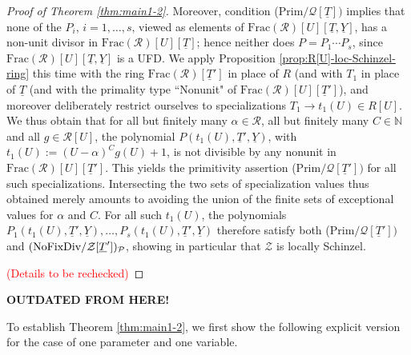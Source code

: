 \documentclass[11pt,a4paper,reqno]{amsart}
\theoremstyle{definition}
\begin{document}
\begin{proof}[Proof of Theorem \ref{thm:main1-2}]
 Moreover, condition {\rm (Prim}$/{\mathcal Q}[\underline T])$ implies that none of the $P_i$, $i=1,\dots, s$, viewed as elements of $\textrm{Frac}(\mathcal{R})[U][\underline{T}, \underline{Y}]$, has a non-unit divisor in $\textrm{Frac}(\mathcal{R})[U][\underline{T}]$; hence neither does $P=P_1\cdots P_s$, since $\textrm{Frac}(\mathcal{R})[U][\underline{T}, \underline{Y}]$ is a UFD. 
We apply Proposition \ref{prop:R[U]-loc-Schinzel-ring} this time with the ring $\textrm{Frac}(\mathcal{R})[\underline{T}']$ in place of $R$ (and with $T_1$ in place of $\underline{T}$ (and with the primality type ``Nonunit" of $\textrm{Frac}(\mathcal{R})[U][\underline{T}']$), and moreover deliberately restrict ourselves to specializations $T_1\to t_1(U)\in R[U]$. We thus obtain
that for all but finitely many $\alpha\in \mathcal{R}$, all but finitely many $C\in \mathbb{N}$ and all $g\in \mathcal{R}[U]$, the polynomial $P(t_1(U),\underline{T}', \underline{Y})$, with $t_1(U):=(U-\alpha)^C g(U)+1$, is not divisible by any nonunit in $\textrm{Frac}(\mathcal{R})[U][\underline{T}']$. This yields the primitivity assertion {\rm(Prim}$/{\mathcal Q}[\underline T'])$ for all such specializations. Intersecting the two sets of specialization values thus obtained merely amounts to avoiding the union of the finite sets of exceptional values for $\alpha$ and $C$. For all such $t_1(U)$, the polynomials $P_1(t_1(U),\underline T', \underline Y), \dots, P_s(t_1(U),\underline T',\underline Y)$ therefore satisfy both {\rm(Prim}$/{\mathcal Q}[\underline T'])$ and $\hbox{\rm (NoFixDiv}/{\mathcal Z}[\underline T'])_{\mathcal P}$, showing in particular that $\mathcal{Z}$ is locally Schinzel.



 \textcolor{red}{(Details to be rechecked)}
\end{proof}
\fi


\iffalse
{\bf OUTDATED FROM HERE!}

To establish Theorem \ref{thm:main1-2}, we first show the following explicit version for the case of one parameter and one variable.
\end{document}
